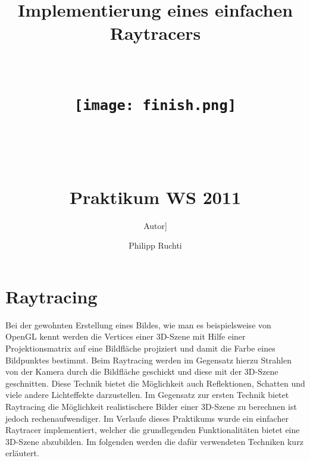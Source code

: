 \documentclass[a4paper]{article}
\begin{document}
\begin{titlepage}
\author{Autor]}
\title{Implementierung eines einfachen Raytracers \\ ~ \\ ~ \\ \texttt{[image: finish.png]} \\ ~ \\ ~ \\ ~ \\ Praktikum WS 2011}
\author{Philipp Ruchti}
\end{titlepage}
\maketitle
\thispagestyle{empty}
\newpage
\setcounter{page}{1}
\section*{Raytracing}
Bei der gewohnten Erstellung eines Bildes, wie man es beispielsweise von OpenGL kennt werden die Vertices einer 3D-Szene mit Hilfe einer Projektionsmatrix auf eine Bildfläche projiziert und damit die Farbe eines Bildpunktes bestimmt. Beim Raytracing werden im Gegensatz hierzu Strahlen von der Kamera durch die Bildfläche geschickt und diese mit der 3D-Szene geschnitten. Diese Technik bietet die Möglichkeit auch Reflektionen, Schatten und viele andere Lichteffekte darzustellen. Im Gegensatz zur ersten Technik bietet Raytracing die Möglichkeit realistischere Bilder einer 3D-Szene zu berechnen ist jedoch rechenaufwendiger.
Im Verlaufe dieses Praktikums wurde ein einfacher Raytracer implementiert, welcher die grundlegenden Funktionalitäten bietet eine 3D-Szene abzubilden. Im folgenden werden die dafür verwendeten Techniken kurz erläutert.
\end{document}
